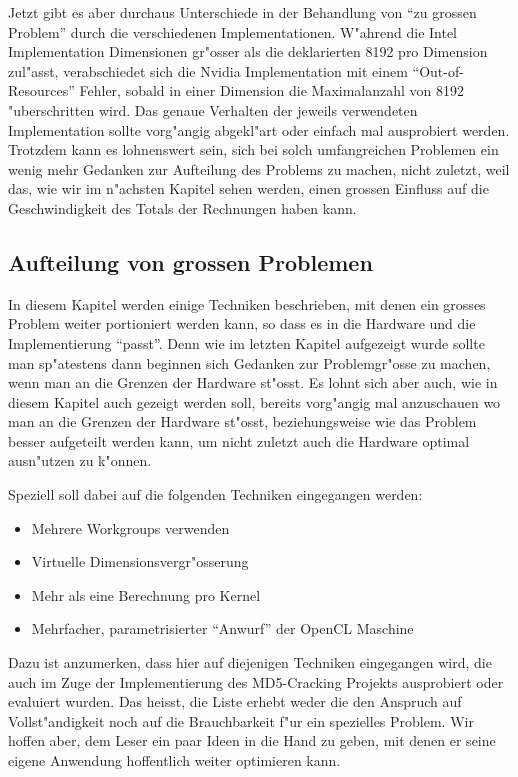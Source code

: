 \begin{refsection}
Jetzt gibt es aber durchaus Unterschiede in der Behandlung von ``zu
grossen Problem'' durch die verschiedenen Implementationen. W"ahrend
die Intel Implementation Dimensionen gr"osser als die deklarierten
8192 pro Dimension zul"asst, verabschiedet sich die Nvidia Implementation
mit einem ``Out-of-Resources'' Fehler, sobald in einer Dimension die 
Maximalanzahl von 8192 "uberschritten wird. Das genaue Verhalten der
jeweils verwendeten Implementation sollte vorg"angig abgekl"art oder
einfach mal ausprobiert werden. Trotzdem kann es lohnenswert sein, sich
bei solch umfangreichen Problemen ein wenig mehr Gedanken zur Aufteilung
des Problems zu machen, nicht zuletzt, weil das, wie wir im n"achsten
Kapitel sehen werden, einen grossen Einfluss auf die Geschwindigkeit des
Totals der Rechnungen haben kann.

\subsection{Aufteilung von grossen Problemen}

In diesem Kapitel werden einige Techniken beschrieben, mit denen ein 
grosses Problem weiter portioniert werden kann, so dass es in die 
Hardware und die Implementierung ``passt''. 
Denn wie im letzten Kapitel aufgezeigt wurde sollte man sp"atestens dann
beginnen sich Gedanken zur Problemgr"osse zu machen, wenn man an die 
Grenzen der Hardware st"osst. Es lohnt sich aber auch, wie in diesem 
Kapitel auch gezeigt werden soll, bereits vorg"angig mal anzuschauen
wo man an die Grenzen der Hardware st"osst, beziehungsweise wie das
Problem besser aufgeteilt werden kann, um nicht zuletzt auch die 
Hardware optimal ausn"utzen zu k"onnen.

Speziell soll dabei auf die folgenden Techniken eingegangen werden:

\begin{itemize}
 \item Mehrere Workgroups verwenden
 \item Virtuelle Dimensionsvergr"osserung
 \item Mehr als eine Berechnung pro Kernel
 \item Mehrfacher, parametrisierter ``Anwurf'' der OpenCL Maschine
\end{itemize}

Dazu ist anzumerken, dass hier auf diejenigen Techniken eingegangen
wird, die auch im Zuge der Implementierung des MD5-Cracking Projekts
ausprobiert oder evaluiert wurden. Das heisst, die Liste erhebt weder
die den Anspruch auf Vollst"andigkeit noch auf die Brauchbarkeit f"ur
ein spezielles Problem. Wir hoffen aber, dem Leser ein paar Ideen
in die Hand zu geben, mit denen er seine eigene Anwendung hoffentlich
weiter optimieren kann.



\end{refsection}
